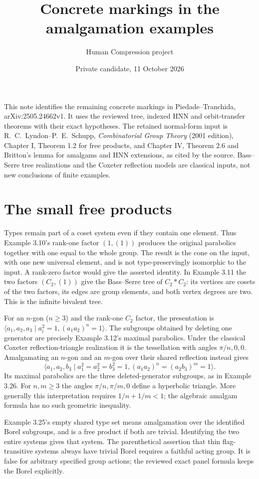 
\title{Concrete markings in the amalgamation examples}
\author{Human Compression project}
\date{Private candidate, 11 October 2026}
\maketitle
This note identifies the remaining concrete markings in
Piedade--Tranchida, arXiv:2505.24662v1. It uses the reviewed tree,
indexed HNN and orbit-transfer theorems with their exact hypotheses.
The retained normal-form input is R.~C.~Lyndon--P.~E.~Schupp,
\emph{Combinatorial Group Theory} (2001 edition), Chapter I,
Theorem 1.2 for free products, and Chapter IV, Theorem 2.6 and
Britton's lemma for amalgams and HNN extensions, as cited by the
source. Bass--Serre tree realizations and the Coxeter reflection
models are classical inputs, not new conclusions of finite examples.

\section{The small free products}
Types remain part of a coset system even if they contain one element.
Thus Example 3.10's rank-one factor $(1,(1))$ produces the original
parabolics together with one equal to the whole group. The result
is the cone on the input, with one new universal element, and is
not type-preservingly isomorphic to the input. A rank-zero factor
would give the asserted identity. In Example 3.11 the two factors
$(C_2,(1))$ give the Bass--Serre tree of $C_2*C_2$: its vertices
are cosets of the two factors, its edges are group elements, and
both vertex degrees are two. This is the infinite bivalent tree.

For an $n$-gon ($n\geq3$) and the rank-one $C_2$ factor, the
presentation is
$\langle a_1,a_2,a_3\mid a_i^2=1,(a_1a_2)^n=1\rangle$.
The subgroups obtained by deleting one generator are precisely
Example 3.12's maximal parabolics. Under the classical Coxeter
reflection-triangle realization it is the tessellation with angles
$\pi/n,0,0$. Amalgamating an $n$-gon and an $m$-gon over their
shared reflection instead gives
\[
 \langle a_1,a_2,b_3\mid a_1^2=a_2^2=b_3^2=1,
 (a_1a_2)^n=(a_2b_3)^m=1\rangle.
\]
Its maximal parabolics are the three deleted-generator subgroups,
as in Example 3.26. For $n,m\geq3$ the angles $\pi/n,\pi/m,0$
define a hyperbolic triangle. More generally this interpretation
requires $1/n+1/m<1$; the algebraic amalgam formula has no such
geometric inequality.

Example 3.25's empty shared type set means amalgamation over the
identified Borel subgroups, and is a free product if both are
trivial. Identifying the two entire systems gives that system.
The parenthetical assertion that thin flag-transitive systems always
have trivial Borel requires a faithful acting group. It is false
for arbitrary specified group actions; the reviewed exact panel
formula keeps the Borel explicitly.

